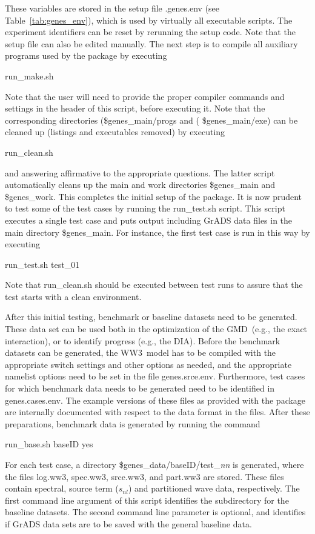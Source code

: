 \documentclass[12pt]{article}
\newcommand{\ws}{WW3}
\newcommand{\gmd}{GMD}
\newcommand{\file}{\sf}
\begin{document}
\noindent
These variables are stored in the setup file {\file .genes.env} (see
Table~\ref{tab:genes_env}), which is used by virtually all executable scripts.
The experiment identifiers can be reset by rerunning the setup code.  Note
that the setup file can also be edited manually. The next step is to compile
all auxiliary programs used by the package by executing
\begin{center}
{\file run\_make.sh}
\end{center}
\noindent
Note that the user will need to provide the proper compiler commands and
settings in the header of this script, before executing it. Note that the
corresponding directories ({\file \$genes\_main/progs} and ({\file
\$genes\_main/exe}) can be cleaned up (listings and executables removed) by
executing
\begin{center}
{\file run\_clean.sh}
\end{center}
\noindent
and answering affirmative to the appropriate questions. The latter script
automatically cleans up the main and work directories {\file \$genes\_main}
and {\file \$genes\_work}. This completes the initial setup of the package. It
is now prudent to test some of the test cases by running the {\file
run\_test.sh} script. This script executes a single test case and puts output
including GrADS data files in the main directory {\file \$genes\_main}. For
instance, the first test case is run in this way by executing
\begin{center}
{\file run\_test.sh test\_01}
\end{center}
\noindent
Note that {\file run\_clean.sh} should be executed between test runs to assure
that the test starts with a clean environment.

After this initial testing, benchmark or baseline datasets need to be
generated. These data set can be used both in the optimization of the \gmd\
(e.g., the exact interaction), or to identify progress (e.g., the DIA). Before
the benchmark datasets can be generated, the \ws\ model has to be compiled
with the appropriate switch settings and other options as needed, and the
appropriate namelist options need to be set in the file {\file
genes.srce.env}.  Furthermore, test cases for which benchmark data needs to be
generated need to be identified in {\file genes.cases.env}. The example
versions of these files as provided with the package are internally documented
with respect to the data format in the files.  After these preparations,
benchmark data is generated by running the command
\begin{center}
{\file run\_base.sh baseID yes}
\end{center}
\noindent
For each test case, a directory {\file \$genes\_data/baseID/test\_{\it nn}} is
generated, where the files {\file log.ww3}, {\file spec.ww3}, {\file
srce.ww3}, and {\file part.ww3} are stored. These files contain spectral,
source term ($s_{nl}$) and partitioned wave data, respectively.  The first
command line argument of this script identifies the subdirectory for the
baseline datasets. The second command line parameter is optional, and
identifies if GrADS data sets are to be saved with the general baseline data.
\end{document}
